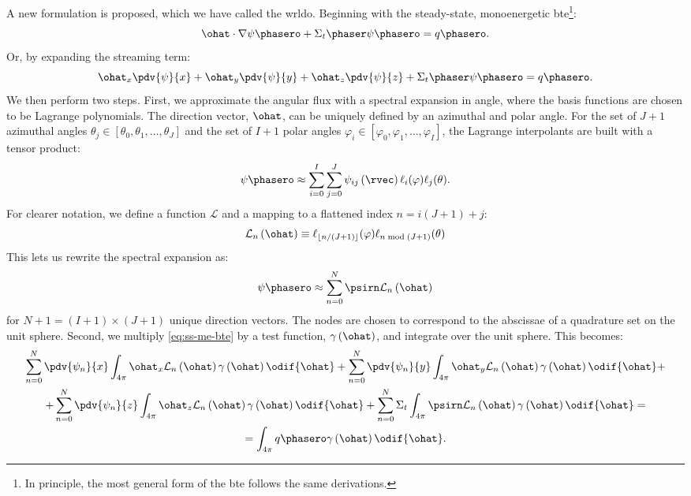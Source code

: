 A new formulation is proposed, which we have called the \gls{wrldo}.
Beginning with the steady-state, monoenergetic \gls{bte}\footnote{In principle, the most general form of the \gls{bte} follows the same derivations.}:
\begin{equation}
  \label{eq:ss-me-bte}
  \ohat\cdot\nabla\psi\phasero+\Sigma_t\phaser\psi\phasero=q\phasero.
\end{equation}
Or, by expanding the streaming term:
\begin{equation}
  \label{eq:exp-ss-me-bte}
  \ohat_x\pdv{\psi}{x}+\ohat_y\pdv{\psi}{y}+\ohat_z\pdv{\psi}{z}+\Sigma_t\phaser\psi\phasero=q\phasero.
\end{equation}
We then perform two steps.
First, we approximate the angular flux with a spectral expansion in angle, where the basis functions are chosen to be Lagrange polynomials.
The direction vector, $\ohat$, can be uniquely defined by an azimuthal and polar angle.
For the set of $J+1$ azimuthal angles $\theta_j\in [\theta_0,\theta_1,\ldots,\theta_{J}]$ and the set of $I+1$ polar angles $\varphi_i\in [\varphi_0,\varphi_1,\ldots,\varphi_I]$, the Lagrange interpolants are built with a tensor product:
\begin{equation}
  \psi\phasero\approx\sum_{i=0}^I\sum_{j=0}^J \psi_{ij}\left(\rvec\right)\ell_i(\varphi) \ell_j(\theta).
\end{equation}
For clearer notation, we define a function $\mathcal{L}$ and a mapping to a flattened index $n=i(J+1)+j$:
\begin{equation}
  \mathcal{L}_n\left(\ohat\right) \equiv \ell_{\lfloor n/(J+1)\rfloor}(\varphi)\ell_{n \bmod (J+1)}(\theta)
\end{equation}
This lets us rewrite the spectral expansion as:
\begin{equation}
  \label{eq:spectral-exp-angle}
  \psi\phasero\approx\sum_{n=0}^N\psirn\mathcal{L}_n\left(\ohat\right)
\end{equation}
for $N+1 = (I+1)\times (J+1)$ unique direction vectors.
The nodes are chosen to correspond to the abscissae of a quadrature set on the unit sphere.
Second, we multiply \cref{eq:ss-me-bte} by a test function, $\gamma\left(\ohat\right)$, and integrate over the unit sphere.
This becomes:
\begin{multline}
  \sum_{n=0}^N\pdv{\psi_n}{x} \int_{4\pi}\ohat_x \mathcal{L}_n\left(\ohat\right)\gamma\left(\ohat\right) \odif{\ohat} +
  \sum_{n=0}^N\pdv{\psi_n}{y} \int_{4\pi}\ohat_y\mathcal{L}_n\left(\ohat\right)\gamma\left(\ohat\right)\odif{\ohat} + \\
  +\sum_{n=0}^N\pdv{\psi_n}{z} \int_{4\pi}\ohat_z\mathcal{L}_n\left(\ohat\right)\gamma\left(\ohat\right)\odif{\ohat} +
  \sum_{n=0}^N \Sigma_t \int_{4\pi}\psirn \mathcal{L}_n\left(\ohat\right)\gamma\left(\ohat\right)\odif{\ohat} = \\
  =\int_{4\pi}q\phasero\gamma\left(\ohat\right)\odif{\ohat}.
\end{multline}
